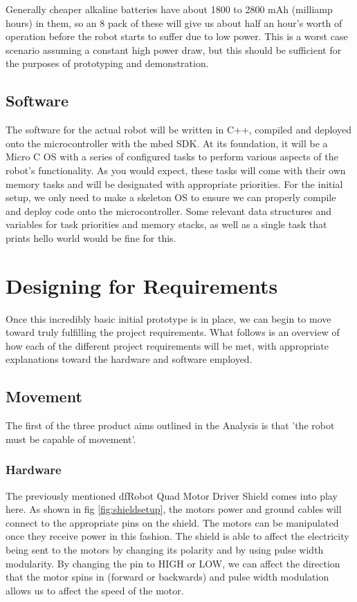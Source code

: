 				Generally cheaper alkaline batteries have about 1800 to 2800 mAh (milliamp hours) in them, so an 8 pack of these will give us about half an hour's worth of operation before the robot starts to suffer due to low power. This is a worst case scenario assuming a constant high power draw, but this should be sufficient for the purposes of prototyping and demonstration. 
			
			\subsection{Software}
			The software for the actual robot will be written in C++, compiled and deployed onto the microcontroller with the mbed SDK. At its foundation, it will be a Micro C OS with a series of configured tasks to perform various aspects of the robot's functionality. As you would expect, these tasks will come with their own memory tasks and will be designated with appropriate priorities. For the initial setup, we only need to make a skeleton OS to ensure we can properly compile and deploy code onto the microcontroller. Some relevant data structures and variables for task priorities and memory stacks, as well as a single task that prints hello world would be fine for this.
		
		\section{Designing for Requirements}
		Once this incredibly basic initial prototype is in place, we can begin to move toward truly fulfilling the project requirements. What follows is an overview of how each of the different project requirements will be met, with appropriate explanations toward the hardware and software employed.
		
			\subsection{Movement}
			The first of the three product aims outlined in the Analysis is that 'the robot must be capable of movement'.
				\subsubsection{Hardware}
				The previously mentioned dfRobot Quad Motor Driver Shield comes into play here. As shown in fig \ref{fig:shieldsetup}, the motors power and ground cables will connect to the appropriate pins on the shield. The motors can be manipulated once they receive power in this fashion. The shield is able to affect the electricity being sent to the motors by changing its polarity and by using pulse width modularity. By changing the pin to HIGH or LOW, we can affect the direction that the motor spins in (forward or backwards) and pulse width modulation allows us to affect the speed of the motor.
				
